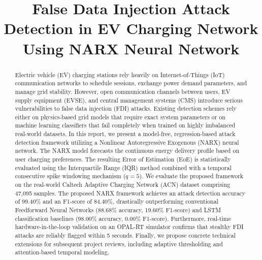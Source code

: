 \documentclass[conference]{IEEEtran}
\begin{document}
\title{False Data Injection Attack Detection in EV Charging Network Using NARX Neural Network}

\author{
}

\maketitle

\begin{abstract}
Electric vehicle (EV) charging stations rely heavily on Internet-of-Things (IoT) communication networks to schedule sessions, exchange power demand parameters, and manage grid stability. However, open communication channels between users, EV supply equipment (EVSE), and central management systems (CMS) introduce serious vulnerabilities to false data injection (FDI) attacks. Existing detection schemes rely either on physics-based grid models that require exact system parameters or on machine learning classifiers that fail completely when trained on highly imbalanced real-world datasets. In this report, we present a model-free, regression-based attack detection framework utilizing a Nonlinear Autoregressive Exogenous (NARX) neural network. The NARX model forecasts the continuous energy delivery profile based on user charging preferences. The resulting Error of Estimation (EoE) is statistically evaluated using the Interquartile Range (IQR) method combined with a temporal consecutive spike windowing mechanism ($q = 5$). We evaluate the proposed framework on the real-world Caltech Adaptive Charging Network (ACN) dataset comprising 47,095 samples. The proposed NARX framework achieves an attack detection accuracy of 99.40\% and an F1-score of 84.40\%, drastically outperforming conventional Feedforward Neural Networks (88.68\% accuracy, 19.60\% F1-score) and LSTM classification baselines (98.00\% accuracy, 0.00\% F1-score). Furthermore, real-time hardware-in-the-loop validation on an OPAL-RT simulator confirms that stealthy FDI attacks are reliably flagged within 5 seconds. Finally, we propose concrete technical extensions for subsequent project reviews, including adaptive thresholding and attention-based temporal modeling.
\end{abstract}
\end{document}
